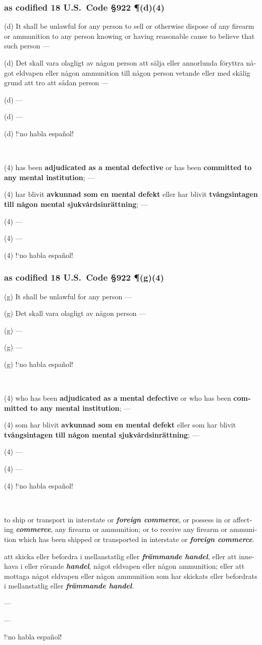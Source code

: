 \documentclass[a4paper,landscape,10pt]{article}
\newcommand{\tblock}[5]{\noindent\begin{minipage}[t]{0.18\textwidth}\foreignlanguage{english}{#1}\end{minipage}\hskip 0.025\textwidth\begin{minipage}[t]{0.18\textwidth}\foreignlanguage{swedish}{#2}\end{minipage}\hskip 0.025\textwidth\begin{minipage}[t]{0.18\textwidth}\foreignlanguage{finnish}{#3}\end{minipage}\hskip 0.025\textwidth\begin{minipage}[t]{0.18\textwidth}\foreignlanguage{french}{#4}\end{minipage}\hskip 0.025\textwidth\begin{minipage}[t]{0.18\textwidth}\foreignlanguage{spanish}{#5}\end{minipage}}
\begin{document}
\subsubsection*{as codified 18 U.S.~Code \S 922 \P(d)(4)}

\tblock
{(d) It shall be unlawful for any person to sell or otherwise dispose of any firearm or ammunition to any person knowing or having reasonable cause to believe that such person ---}
{(d) Det skall vara olagligt av någon person att sälja eller annorlunda föryttra något eldvapen eller någon ammunition till någon person vetande eller med skälig grund att tro att sådan person ---}
{(d) ---}
{(d) ---}
{(d) !`no habla español!}

~

\tblock
{(4) has been \textbf{adjudicated as a mental defective} or has been \textbf{committed to any mental institution}; ---}
{(4) har blivit \textbf{avkunnad som en mental defekt} eller har blivit \textbf{tvångsintagen till någon mental sjukvårdsinrättning}; ---}
{(4) ---}
{(4) ---}
{(4) !`no habla español!}


\subsubsection*{as codified 18 U.S.~Code \S 922 \P(g)(4)}


\tblock
{(g) It shall be unlawful for any person ---}
{(g) Det skall vara olagligt av någon person ---}
{(g) ---}
{(g) ---}
{(g) !`no habla español!}

~

\tblock
{(4) who has been \textbf{adjudicated as a mental defective} or who has been \textbf{committed to any mental institution}; ---}
{(4) som har blivit \textbf{avkunnad som en mental defekt} eller som har blivit \textbf{tvångsintagen till någon mental sjukvårdsinrättning}; ---}
{(4) ---}
{(4) ---}
{(4) !`no habla español!}

~

\tblock
{to ship or transport in interstate or \textbf{\textit{foreign commerce}}, or possess in or affecting \textbf{\textit{commerce}}, any firearm or ammunition; or to receive any firearm or ammunition which has been shipped or transported in interstate or \textbf{\textit{foreign commerce}}.}
{att skicka eller befordra i mellanstatlig eller \textbf{\textit{främmande handel}}, eller att innehava i eller rörande \textbf{\textit{handel}}, något eldvapen eller någon ammunition; eller att mottaga något eldvapen eller någon ammunition som har skickats eller befordrats i mellanstatlig eller \textbf{\textit{främmande handel}}.}
{---}
{---}
{!`no habla español!}
\end{document}

